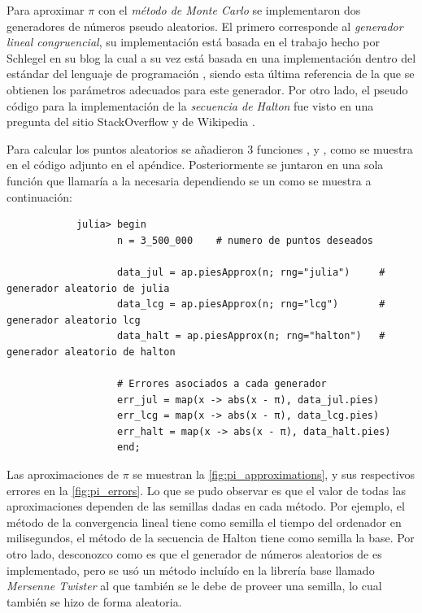 \begin{enumerate}
\begin{solution}
        Para aproximar $\pi$ con el \textit{método de Monte Carlo} se implementaron dos generadores de números pseudo aleatorios. El primero corresponde al \textit{generador lineal congruencial}, su implementación está basada en el trabajo hecho por Schlegel en su blog \cite{schlegel2008lcg} la cual a su vez está basada en una implementación dentro del estándar del lenguaje de programación  \cite{saucier2000computer}, siendo esta última referencia de la que se obtienen los parámetros adecuados para este generador. Por otro lado, el pseudo código para la implementación de la \textit{secuencia de Halton} fue visto en una pregunta del sitio StackOverflow \cite{stack2013halton} y de Wikipedia \cite{wiki2013halton}.

        Para calcular los puntos aleatorios se añadieron 3 funciones ,  y , como se muestra en el código adjunto en el apéndice. Posteriormente se juntaron en una sola función que llamaría a la necesaria dependiendo se un  como se muestra a continuación:
        \begin{verbatim}
            julia> begin
                   n = 3_500_000    # numero de puntos deseados
                   
                   data_jul = ap.piesApprox(n; rng="julia")     # generador aleatorio de julia
                   data_lcg = ap.piesApprox(n; rng="lcg")       # generador aleatorio lcg
                   data_halt = ap.piesApprox(n; rng="halton")   # generador aleatorio de halton
                   
                   # Errores asociados a cada generador
                   err_jul = map(x -> abs(x - π), data_jul.pies)
                   err_lcg = map(x -> abs(x - π), data_lcg.pies)
                   err_halt = map(x -> abs(x - π), data_halt.pies)
                   end;
        \end{verbatim}

        Las aproximaciones de $\pi$ se muestran la \cref{fig:pi_approximations}, y sus respectivos errores en la \cref{fig:pi_errors}. Lo que se pudo observar es que el valor de todas las aproximaciones dependen de las semillas dadas en cada método. Por ejemplo, el método de la convergencia lineal tiene como semilla el tiempo del ordenador en milisegundos, el método de la secuencia de Halton tiene como semilla la base. Por otro lado, desconozco como es que el generador de números aleatorios de  es implementado, pero se usó un método incluído en la librería base llamado \textit{Mersenne Twister} \cite{wiki2013mersenne} al que también se le debe de proveer una semilla, lo cual también se hizo de forma aleatoria.


\end{solution}
\end{enumerate}

